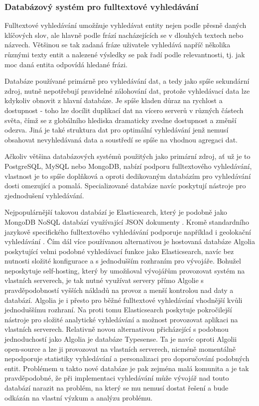 		\subsubsection{Databázový systém pro fulltextové vyhledávání}

		Fulltextové vyhledávání umožňuje vyhledávat entity nejen podle přesně daných klíčových slov, ale hlavně podle
		frází nacházejících se v dlouhých textech nebo názvech.
		Většinou se tak zadaná fráze uživatele vyhledává napříč několika různými texty entit a nalezené výsledky se pak
		řadí podle relevantnosti, tj. jak moc daná entita odpovídá hledané frázi.

		Databáze používané primárně pro vyhledávání dat, a tedy jako spíše sekundární zdroj, nutně nepotřebují pravidelné
		zálohování dat, protože vyhledávací data lze kdykoliv obnovit z hlavní databáze.
		Je spíše kladen důraz na rychlost a dostupnost - toho lze docílit duplikací dat na vícero serverů v různých částech
		světa, čímž se z globálního hlediska dramaticky zvedne dostupnost a změnší odezva.
		Jiná je také struktura dat pro optimální vyhledávání jenž nemusí obsahovat nevyhledávaná data
		a soustředí se spíše na vhodnou agregaci dat.

		Ačkoliv většina databázových systémů použitých jako primární zdroj, ať už je to PostgreSQL, MySQL nebo MongoDB,
		nabízí podporu fulltextového vyhledávání, vlastnost je to spíše doplňková a oproti dedikovaným databázím
		pro vyhledávání dosti omezující a pomalá.
		Specializované databáze navíc poskytují nástroje pro zjednodušení vyhledávání.

		Nejpopulárnější takovou databází je Elasticsearch, který je podobně jako MongoDB \Ac{NoSQL} databází
		využívající \Ac{JSON} dokumenty \cite{es_documents}.
		Kromě standardního jazykově specifického fulltextového vyhledávání podporuje například i geolokační vyhledávání
		\cite{es_documents}.
		Čím dál více používanou alternativou je hostovaná databáze Algolia poskytující velmi podobné vyhledávací
		funkce jako Elasticsearch, navíc bez nutnosti složité konfigurace a s jednodušším rozhraním pro vývojáře.
		Bohužel neposkytuje self-hosting, který by umožňoval vývojářům provozovat systém na vlastních serverech, je tak
		nutné využívat servery přímo Algolie s pravděpodobností vyšších nákladů na provoz a menší kontrolou nad daty a
		databází.
		Algolia je i přesto pro běžné fulltextové vyhledávání vhodnější kvůli jednoduššímu rozhraní.
		Na proti tomu Elasticsearch poskytuje pokročilejší nástroje pro složité analytické vyhledávání a možnost
		provozovat aplikaci na vlastních serverech.\cite{es_vs_algolia}
		Relativně novou alternativou přicházející s podobnou jednoduchostí jako Algolia je databáze Typesense.
		Ta je navíc oproti Algolii open-source a lze ji provozovat na vlastních serverech, nicméně momentálně nepodporuje
		statistiky vyhledávání a personalizaci pro doporučování podobných entit.\cite{typesence}
		Problémem u takto nové databáze je pak zejména malá komunita a je tak pravděpodobné, že při implementaci vyhledávání
		může vývojář nad touto databází narazit na problém, na který se mu nemusí dostat řešení a bude odkázán na vlastní
		výzkum a analýzu problému.

